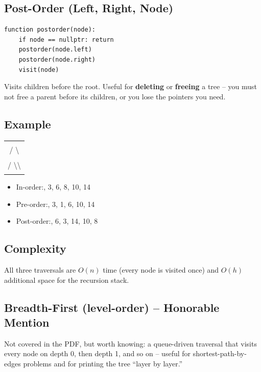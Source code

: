 \documentclass[11pt]{article}
\begin{document}
\subsection*{Post-Order (Left, Right, Node)}
\begin{lstlisting}[basicstyle=\ttfamily\small,frame=single]
function postorder(node):
    if node == nullptr: return
    postorder(node.left)
    postorder(node.right)
    visit(node)
\end{lstlisting}
Visits children before the root. Useful for \textbf{deleting} or
\textbf{freeing} a tree -- you must not free a parent before its
children, or you lose the pointers you need.

\subsection*{Example}
\begin{center}
\begin{tabular}{c}
\qquad\qquad 8 \\
\qquad\quad / \quad \textbackslash \\
\qquad 3 \qquad 10 \\
\qquad / \textbackslash \qquad \textbackslash \\
\quad 1 \quad 6 \qquad 14
\end{tabular}
\end{center}
\begin{itemize}[leftmargin=*]
    \item In-order:, 3, 6, 8, 10, 14
    \item Pre-order:, 3, 1, 6, 10, 14
    \item Post-order:, 6, 3, 14, 10, 8
\end{itemize}

\subsection*{Complexity}
All three traversals are $O(n)$ time (every node is visited once) and
$O(h)$ additional space for the recursion stack.

\subsection*{Breadth-First (level-order) -- Honorable Mention}
Not covered in the PDF, but worth knowing: a queue-driven traversal
that visits every node on depth 0, then depth 1, and so on -- useful
for shortest-path-by-edges problems and for printing the tree
``layer by layer.''
\end{document}
